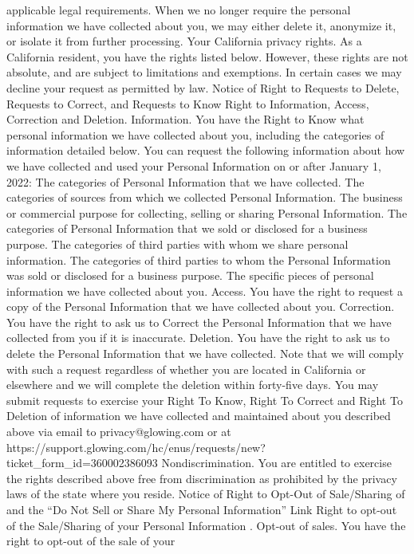 applicable legal requirements.
When we no longer require the personal information we have collected
about you, we may either delete it, anonymize it, or isolate it from further
processing.
Your California privacy rights. As a California resident, you have the
rights listed below. However, these rights are not absolute, and are
subject to limitations and exemptions. In certain cases we may decline
your request as permitted by law.
Notice of Right to Requests to Delete, Requests to Correct, and
Requests to Know
Right to Information, Access, Correction and Deletion.
Information. You have the Right to Know what personal information
we have collected about you, including the categories of
information detailed below. You can request the following
information about how we have collected and used your Personal
Information on or after January 1, 2022:
The categories of Personal Information that we have collected.
The categories of sources from which we collected Personal
Information.
The business or commercial purpose for collecting, selling or
sharing Personal Information.
The categories of Personal Information that we sold or
disclosed for a business purpose.
The categories of third parties with whom we share personal
information.
The categories of third parties to whom the Personal
Information was sold or disclosed for a business purpose.
The specific pieces of personal information we have collected
about you.
Access. You have the right to request a copy of the Personal
Information that we have collected about you.
Correction. You have the right to ask us to Correct the Personal
Information that we have collected from you if it is inaccurate.
Deletion. You have the right to ask us to delete the Personal
Information that we have collected. Note that we will comply with
such a request regardless of whether you are located in California
or elsewhere and we will complete the deletion within forty-five
days.
You may submit requests to exercise your Right To Know, Right To
Correct and Right To Deletion of information we have collected and
maintained about you described above via email
to privacy@glowing.com or at https://support.glowing.com/hc/enus/requests/new?ticket_form_id=360002386093
Nondiscrimination. You are entitled to exercise the rights described
above free from discrimination as prohibited by the privacy laws of the
state where you reside.
Notice of Right to Opt-Out of Sale/Sharing of and the “Do
Not Sell or Share My Personal Information” Link
Right to opt-out of the Sale/Sharing of your Personal
Information
.
Opt-out of sales. You have the right to opt-out of the sale of your
